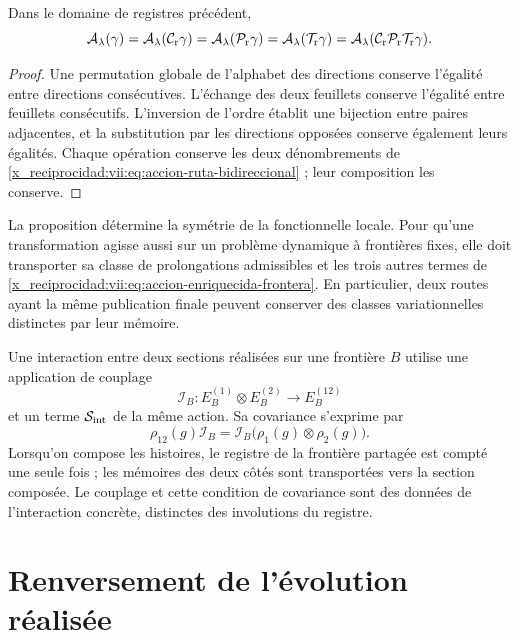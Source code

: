 \begin{proposition}
\label{x_reciprocidad:vii:prop:invariancia-ruta-bidireccional}
Dans le domaine de registres précédent,
\[
 \mathcal A_\lambda(\gamma)
 =\mathcal A_\lambda(\mathcal C_{\rm r}\gamma)
 =\mathcal A_\lambda(\mathcal P_{\rm r}\gamma)
 =\mathcal A_\lambda(\mathcal T_{\rm r}\gamma)
 =\mathcal A_\lambda(\mathcal C_{\rm r}\mathcal P_{\rm r}
                              \mathcal T_{\rm r}\gamma).
\]
\end{proposition}
\begin{proof}
Une permutation globale de l'alphabet des directions conserve l'égalité
entre directions consécutives. L'échange des deux feuillets conserve
l'égalité entre feuillets consécutifs. L'inversion de l'ordre établit une
bijection entre paires adjacentes, et la substitution par les directions opposées
conserve également leurs égalités. Chaque opération conserve les deux dénombrements
de \eqref{x_reciprocidad:vii:eq:accion-ruta-bidireccional} ; leur composition les conserve.
\end{proof}

La proposition détermine la symétrie de la fonctionnelle locale. Pour qu'une
transformation agisse aussi sur un problème dynamique à frontières fixes,
elle doit transporter sa classe de prolongations admissibles et les trois autres
termes de \eqref{x_reciprocidad:vii:eq:accion-enriquecida-frontera}. En particulier, deux
routes ayant la même publication finale peuvent conserver des classes
variationnelles distinctes par leur mémoire.

Une interaction entre deux sections réalisées sur une frontière \(B\)
utilise une application de couplage
\[
 \mathcal I_B:E_B^{(1)}\otimes E_B^{(2)}\longrightarrow E_B^{(12)}
\]
et un terme \(\mathcal S_{\rm int}\) de la même action. Sa covariance s'exprime par
\[
 \rho_{12}(g)\mathcal I_B
 =\mathcal I_B\bigl(\rho_1(g)\otimes\rho_2(g)\bigr).
\]
Lorsqu'on compose les histoires, le registre de la frontière partagée est compté
une seule fois ; les mémoires des deux côtés sont transportées vers la section composée.
Le couplage et cette condition de covariance sont des données de l'interaction
concrète, distinctes des involutions du registre.

\section{Renversement de l'évolution réalisée}
\label{x_reciprocidad:vii:subsec:reversion-evolucion}

